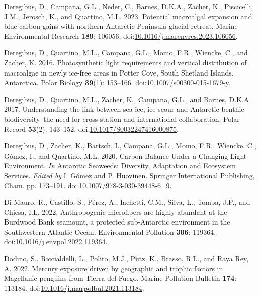 \documentclass[
]{article}
\newlength{\cslhangindent}
\newenvironment{CSLReferences}[2] %
 {\begin{list}{}{%
  \setlength{\itemindent}{0pt}
  \setlength{\leftmargin}{0pt}
  \setlength{\parsep}{0pt}
  \ifodd #1
   \setlength{\leftmargin}{\cslhangindent}
   \setlength{\itemindent}{-1\cslhangindent}
  \fi
  \setlength{\itemsep}{#2\baselineskip}}}
 {\end{list}}
\begin{document}
\begin{CSLReferences}{1}{0}
Deregibus, D., Campana, G.L., Neder, C., Barnes, D.K.A., Zacher, K.,
Piscicelli, J.M., Jerosch, K., and Quartino, M.L. 2023. Potential
macroalgal expansion and blue carbon gains with northern {Antarctic
Peninsula} glacial retreat. Marine Environmental Research \textbf{189}:
106056.
doi:\href{https://doi.org/10.1016/j.marenvres.2023.106056}{10.1016/j.marenvres.2023.106056}.

Deregibus, D., Quartino, M.L., Campana, G.L., Momo, F.R., Wiencke, C.,
and Zacher, K. 2016. Photosynthetic light requirements and vertical
distribution of macroalgae in newly ice-free areas in {Potter Cove},
{South Shetland Islands}, {Antarctica}. Polar Biology \textbf{39}(1):
153--166.
doi:\href{https://doi.org/10.1007/s00300-015-1679-y}{10.1007/s00300-015-1679-y}.

Deregibus, D., Quartino, M.L., Zacher, K., Campana, G.L., and Barnes,
D.K.A. 2017. Understanding the link between sea ice, ice scour and
{Antarctic} benthic biodiversity--the need for cross-station and
international collaboration. Polar Record \textbf{53}(2): 143--152.
doi:\href{https://doi.org/10.1017/S0032247416000875}{10.1017/S0032247416000875}.

Deregibus, D., Zacher, K., Bartsch, I., Campana, G.L., Momo, F.R.,
Wiencke, C., Gómez, I., and Quartino, M.L. 2020. Carbon {Balance Under}
a {Changing Light Environment}. \emph{In} Antarctic {Seaweeds}:
{Diversity}, {Adaptation} and {Ecosystem Services}. \emph{Edited by} I.
Gómez and P. Huovinen. Springer International Publishing, Cham. pp.
173--191.
doi:\href{https://doi.org/10.1007/978-3-030-39448-6_9}{10.1007/978-3-030-39448-6\_9}.

Di Mauro, R., Castillo, S., Pérez, A., Iachetti, C.M., Silva, L., Tomba,
J.P., and Chiesa, I.L. 2022. Anthropogenic microfibers are highly
abundant at the {Burdwood Bank} seamount, a protected sub-{Antarctic}
environment in the {Southwestern Atlantic Ocean}. Environmental
Pollution \textbf{306}: 119364.
doi:\href{https://doi.org/10.1016/j.envpol.2022.119364}{10.1016/j.envpol.2022.119364}.

Dodino, S., Riccialdelli, L., Polito, M.J., Pütz, K., Brasso, R.L., and
Raya Rey, A. 2022. Mercury exposure driven by geographic and trophic
factors in {Magellanic} penguins from {Tierra} del {Fuego}. Marine
Pollution Bulletin \textbf{174}: 113184.
doi:\href{https://doi.org/10.1016/j.marpolbul.2021.113184}{10.1016/j.marpolbul.2021.113184}.


\end{CSLReferences}
\end{document}
